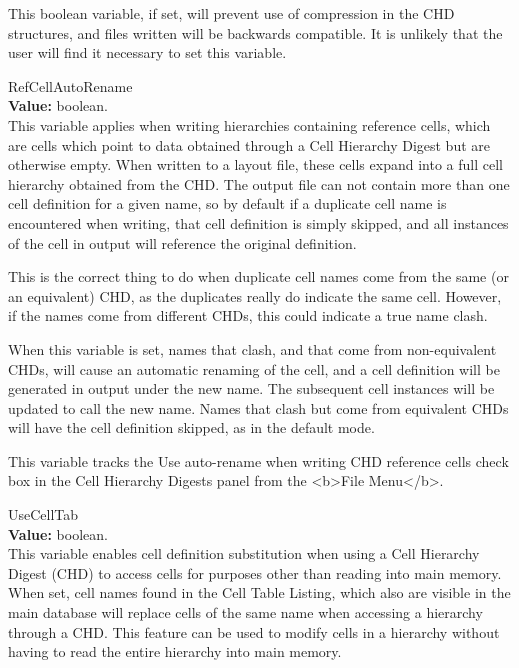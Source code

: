 \begin{description}
This boolean variable, if set, will prevent use of compression in the
CHD structures, and files written will be backwards compatible.  It is
unlikely that the user will find it necessary to set this variable.

\item{\et RefCellAutoRename}\\
{\bf Value:} boolean.\\
This variable applies when writing hierarchies containing reference
cells, which are cells which point to data obtained through a Cell
Hierarchy Digest but are otherwise empty.  When written to a layout
file, these cells expand into a full cell hierarchy obtained from the
CHD.  The output file can not contain more than one cell definition
for a given name, so by default if a duplicate cell name is
encountered when writing, that cell definition is simply skipped, and
all instances of the cell in output will reference the original
definition.

This is the correct thing to do when duplicate cell names come from
the same (or an equivalent) CHD, as the duplicates really do indicate
the same cell.  However, if the names come from different CHDs, this
could indicate a true name clash.

When this variable is set, names that clash, and that come from
non-equivalent CHDs, will cause an automatic renaming of the cell, and
a cell definition will be generated in output under the new name.  The
subsequent cell instances will be updated to call the new name.  Names
that clash but come from equivalent CHDs will have the cell definition
skipped, as in the default mode.

This variable tracks the {\cb Use auto-rename when writing CHD
reference cells} check box in the {\cb Cell Hierarchy Digests} panel
from the <b>File Menu</b>.

\item{\et UseCellTab}\\
{\bf Value:} boolean.\\
This variable enables cell definition substitution when using a Cell
Hierarchy Digest (CHD) to access cells for purposes other than reading
into main memory.  When set, cell names found in the {\cb Cell Table
Listing}, which also are visible in the main database will replace
cells of the same name when accessing a hierarchy through a CHD.  This
feature can be used to modify cells in a hierarchy without having to
read the entire hierarchy into main memory.


\end{description}
